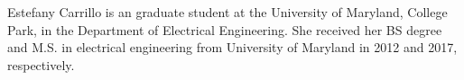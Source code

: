\documentclass[journal]{IEEEtran}
\begin{document}
% 
\begin{IEEEbiographynophoto}{Estefany Carrillo}
is an graduate student at the University of Maryland, College Park, in the Department of Electrical Engineering. She received her BS degree and M.S. in electrical engineering from University of Maryland in 2012 and 2017, respectively.  
\end{IEEEbiographynophoto}

\end{document}
